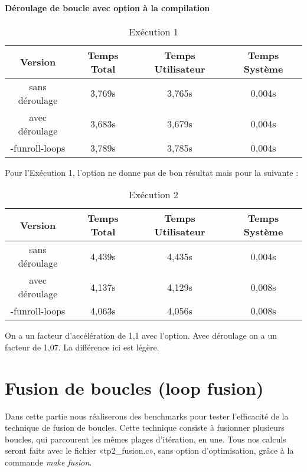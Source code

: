 \documentclass{rapport}
\begin{document}
      \subsection{Déroulage de boucle avec option à la compilation}
      
      \begin{table}[H]
    \centering
    \begin{tabular}{|c|c|c|c|}
        \hline
        Version & Temps Total & Temps Utilisateur & Temps Système \\
        \hline
        sans déroulage & 3,769s & 3,765s & 0,004s \\
        \hline
        avec déroulage & 3,683s &3,679s  & 0,004s \\
        \hline
        -funroll-loops & 3,789s & 3,785s & 0,004s \\
        \hline
    \end{tabular}
    \caption{Exécution 1}
\end{table}
Pour l'Exécution 1, l'option ne donne pas de bon résultat mais pour la suivante :\newline\newline
\begin{table}[H]
    \centering
    \begin{tabular}{|c|c|c|c|}
        \hline
        Version & Temps Total & Temps Utilisateur & Temps Système \\
        \hline
        sans déroulage & 4,439s & 4,435s & 0,004s \\
        \hline
        avec déroulage & 4,137s & 4,129s & 0,008s \\
        \hline
        -funroll-loops & 4,063s & 4,056s & 0,008s \\
        \hline
    \end{tabular}
    \caption{Exécution 2}
\end{table}
On a un facteur d'accélération de 1,1 avec l'option. Avec déroulage on a un facteur de 1,07. La différence ici est légère.

\clearpage
\part{Fusion de boucles (loop fusion)}\setcounter{section}{0}
Dans cette partie nous réaliserons des benchmarks pour tester l'efficacité de la technique de fusion de boucles.
Cette technique consiste à fusionner plusieurs boucles, qui parcourent les mêmes plages d'itération, en une. Tous nos calculs seront faits avec le fichier «tp2\_fusion.c», sans option d'optimisation, grâce à la commande \textit{make fusion}.
\end{document}
